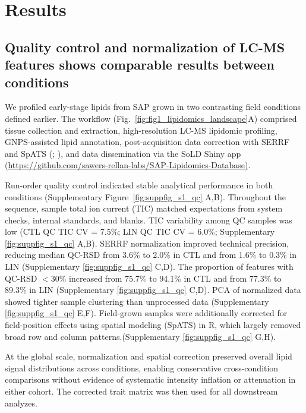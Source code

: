 \documentclass[9pt,twocolumn,twoside]{rilabRxiv}
\begin{document}

\section{Results}

\subsection*{Quality control and normalization of LC-MS features shows comparable results between conditions}

We profiled early-stage lipids from SAP grown in two contrasting field conditions defined earlier. The workflow (Fig.~\ref{fig:fig1_lipidomics_landscape}A) comprised tissue collection and extraction, high-resolution LC-MS lipidomic profiling, GNPS-assisted lipid annotation, post-acquisition data correction with SERRF and SpATS (\cite{Fan2019}; \cite{RodriguezAlvarez2018}), and data dissemination via the SoLD Shiny app (\url{https://github.com/sawers-rellan-labs/SAP-Lipidomics-Database)}.

Run-order quality control indicated stable analytical performance in both conditions (Supplementary Figure~\ref{fig:suppfig_s1_qc} A,B). Throughout the sequence, sample total ion current (TIC) matched expectations from system checks, internal standards, and blanks. TIC variability among QC samples was low (CTL QC TIC CV = 7.5\%; LIN QC TIC CV = 6.0\%; Supplementary \ref{fig:suppfig_s1_qc} A,B). SERRF normalization improved technical precision, reducing median QC-RSD from 3.6\% to 2.0\% in CTL and from 1.6\% to 0.3\% in LIN (Supplementary \ref{fig:suppfig_s1_qc} C,D). The proportion of features with QC-RSD $<30\%$ increased from 75.7\% to 94.1\% in CTL and from 77.3\% to 89.3\% in LIN (Supplementary \ref{fig:suppfig_s1_qc} C,D). PCA of normalized data showed tighter sample clustering than unprocessed data (Supplementary \ref{fig:suppfig_s1_qc} E,F). Field-grown samples were additionally corrected for field-position effects using spatial modeling (SpATS) in R, which largely removed broad row and column patterns.(Supplementary \ref{fig:suppfig_s1_qc} G,H).

At the global scale, normalization and spatial correction preserved overall lipid signal distributions across conditions, enabling conservative cross-condition comparisons without evidence of systematic intensity inflation or attenuation in either cohort. The corrected trait matrix was then used for all downstream analyzes.
\end{document}

